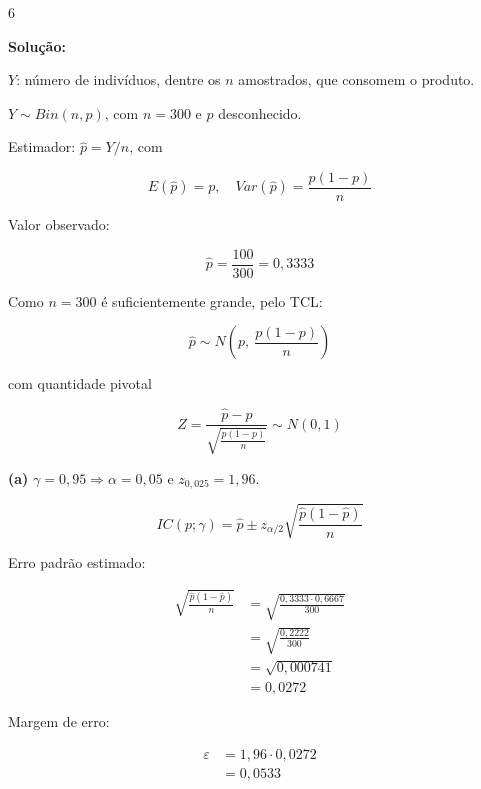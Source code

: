 \documentclass[8pt, a4paper, landscape]{extarticle}
\begin{document}
\begin{multicols}{6}
\vspace{0.3cm}

\textbf{Solução:}

$Y$: número de indivíduos, dentre os $n$ amostrados, que consomem o produto.

$Y \sim Bin(n, p)$, com $n = 300$ e $p$ desconhecido.

Estimador: $\hat{p} = Y/n$, com

\begin{equation*}
E(\hat{p}) = p, \quad Var(\hat{p}) = \frac{p(1-p)}{n}
\end{equation*}

Valor observado:

\begin{equation*}
\hat{p} = \frac{100}{300} = 0,3333
\end{equation*}

Como $n = 300$ é suficientemente grande, pelo TCL:

\begin{equation*}
\hat{p} \sim N\left(p,\ \frac{p(1-p)}{n}\right)
\end{equation*}

com quantidade pivotal

\begin{equation*}
Z = \frac{\hat{p} - p}{\sqrt{\frac{p(1-p)}{n}}} \sim N(0,1)
\end{equation*}

\vspace{0.2cm}

\textbf{(a)} $\gamma = 0,95 \Rightarrow \alpha = 0,05$ e $z_{0,025} = 1,96$.

\begin{equation*}
IC(p;\gamma) = \hat{p} \pm z_{\alpha/2}\sqrt{\frac{\hat{p}(1-\hat{p})}{n}}
\end{equation*}

Erro padrão estimado:

\begin{equation*}
\begin{split}
\sqrt{\frac{\hat{p}(1-\hat{p})}{n}} &= \sqrt{\frac{0,3333 \cdot 0,6667}{300}} \\
&= \sqrt{\frac{0,2222}{300}} \\
&= \sqrt{0,000741} \\
&= 0,0272
\end{split}
\end{equation*}

Margem de erro:

\begin{equation*}
\begin{split}
\varepsilon &= 1,96 \cdot 0,0272 \\
&= 0,0533
\end{split}
\end{equation*}


\end{multicols}
\end{document}
